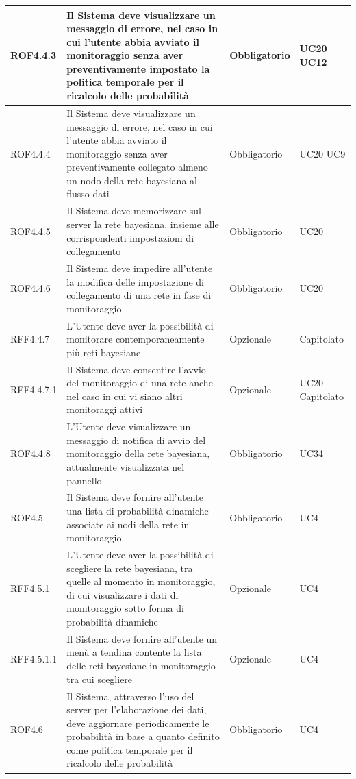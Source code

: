 \begin{center}
\begin{longtable}[c]{|m{}|m{}|m{}|m{}|}
\hline
\rowcolor{grigio}ROF4.4.3 & Il Sistema deve visualizzare un messaggio di errore, nel caso in cui l'utente abbia avviato il monitoraggio senza aver preventivamente impostato la politica temporale per il ricalcolo delle probabilità & Obbligatorio & UC20 UC12\\
\hline
ROF4.4.4 & Il Sistema deve visualizzare un messaggio di errore, nel caso in cui l'utente abbia avviato il monitoraggio senza aver preventivamente collegato almeno un nodo della rete bayesiana al flusso dati & Obbligatorio & UC20 UC9\\
\hline
\rowcolor{grigio}ROF4.4.5 & Il Sistema deve memorizzare sul server la rete bayesiana, insieme alle corrispondenti impostazioni di collegamento & Obbligatorio & UC20\\
\hline
ROF4.4.6 & Il Sistema deve impedire all'utente la modifica delle impostazione di collegamento di una rete in fase di monitoraggio & Obbligatorio & UC20\\
\hline
\rowcolor{grigio}RFF4.4.7 & L'Utente deve aver la possibilità di monitorare contemporaneamente più reti bayesiane & Opzionale & Capitolato\\
\hline
RFF4.4.7.1 & Il Sistema deve consentire l'avvio del monitoraggio di una rete anche nel caso in cui vi siano altri monitoraggi attivi & Opzionale & UC20 Capitolato\\
\hline
\rowcolor{grigio}ROF4.4.8 & L'Utente deve visualizzare un messaggio di notifica di avvio del monitoraggio della rete bayesiana, attualmente visualizzata nel pannello & Obbligatorio & UC34\\
\hline
ROF4.5 & Il Sistema deve fornire all'utente una lista di probabilità dinamiche associate ai nodi della rete in monitoraggio & Obbligatorio & UC4\\
\hline
\rowcolor{grigio}RFF4.5.1 & L'Utente deve aver la possibilità di scegliere la rete bayesiana, tra quelle al momento in monitoraggio, di cui visualizzare i dati di monitoraggio sotto forma di probabilità dinamiche & Opzionale & UC4\\
\hline
RFF4.5.1.1 & Il Sistema deve fornire all'utente un menù a tendina contente la lista delle reti bayesiane in monitoraggio tra cui scegliere & Opzionale & UC4\\
\hline
\rowcolor{grigio}ROF4.6 & Il Sistema, attraverso l'uso del server per l'elaborazione dei dati, deve aggiornare periodicamente le probabilità in base a quanto definito come politica temporale per il ricalcolo delle probabilità & Obbligatorio & UC4\\

\end{longtable}
\end{center}
